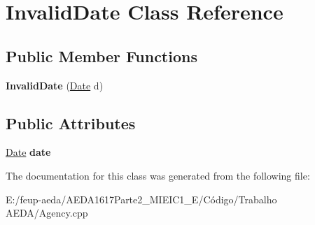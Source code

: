 \hypertarget{class_invalid_date}{}\section{Invalid\+Date Class Reference}
\label{class_invalid_date}
\subsection*{Public Member Functions}
\begin{DoxyCompactItemize}
\item 
\mbox{\label{class_invalid_date_a9cccc591c3a07535f26d1ec06b4087fd}} 
{\bfseries Invalid\+Date} (\hyperlink{class_date}{Date} d)
\end{DoxyCompactItemize}
\subsection*{Public Attributes}
\begin{DoxyCompactItemize}
\item 
\mbox{\label{class_invalid_date_a22b43ab189cf85971b69f8a7e363edbe}} 
\hyperlink{class_date}{Date} {\bfseries date}
\end{DoxyCompactItemize}


The documentation for this class was generated from the following file\+:\begin{DoxyCompactItemize}
\item 
E\+:/feup-\/aeda/\+A\+E\+D\+A1617\+Parte2\+\_\+M\+I\+E\+I\+C1\+\_\+\+E/\+Código/\+Trabalho A\+E\+D\+A/Agency.\+cpp\end{DoxyCompactItemize}
